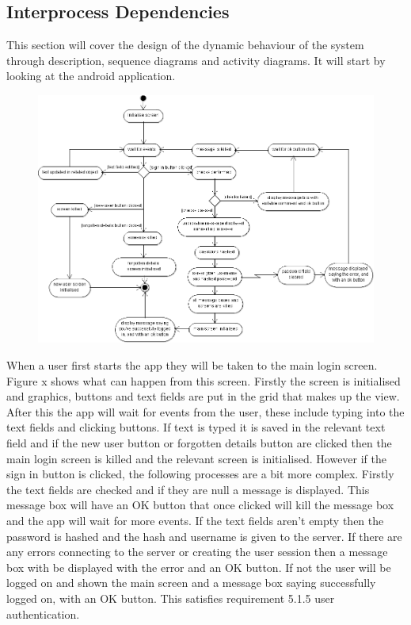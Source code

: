 \setcounter{section}{3}
\setcounter{subsection}{1}

\subsection{Interprocess Dependencies}
This section will cover the design of the dynamic behaviour of the system through description, sequence diagrams and activity diagrams. It will start by looking at the android application.

\begin{figure}[h!]
    \centering
    \includegraphics[width=\textwidth]{images/activity/main-login}
\end{figure}

When a user first starts the app they will be taken to the main login screen. Figure x shows what can happen from this screen. Firstly the screen is initialised and graphics, buttons and text fields are put in the grid that makes up the view. After this the app will wait for events from the user, these include typing into the text fields and clicking buttons. If text is typed it is saved in the relevant text field and if the new user button or forgotten details button are clicked then the main login screen is killed and the relevant screen is initialised. However if the sign in button is clicked, the following processes are a bit more complex. Firstly the text fields are checked and if they are null a message is displayed. This message box will have an OK button that once clicked will kill the message box and the app will wait for more events. If the text fields aren't empty then the password is hashed and the hash and username is given to the server. If there are any errors connecting to the server or creating the user session then a message box with be displayed with the error and an OK button. If not the user will be logged on and shown the main screen and a message box saying successfully logged on, with an OK button. This satisfies requirement 5.1.5 user authentication.

